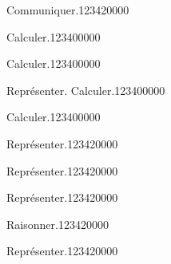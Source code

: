 \begin{pageAD} 
 

 
  
\begin{ExoCad}{Communiquer.}{1234}{2}{0}{0}{0}{0}

 
\end{ExoCad}


\begin{ExoCad}{Calculer.}{1234}{0}{0}{0}{0}{0}

 
 
\end{ExoCad}

\begin{ExoCad}{Calculer.}{1234}{0}{0}{0}{0}{0}

 
\end{ExoCad}



\begin{ExoCad}{Représenter. Calculer.}{1234}{0}{0}{0}{0}{0}

 
 
\end{ExoCad}

\begin{ExoCad}{Calculer.}{1234}{0}{0}{0}{0}{0}

 
\end{ExoCad}

 
\end{pageAD}


\begin{pageParcoursu} 

\begin{ExoCu}{Représenter.}{1234}{2}{0}{0}{0}{0}


\end{ExoCu}
\begin{ExoCu}{Représenter.}{1234}{2}{0}{0}{0}{0}


\end{ExoCu}
\begin{ExoCu}{Représenter.}{1234}{2}{0}{0}{0}{0}

\end{ExoCu}


\begin{ExoCu}{Raisonner.}{1234}{2}{0}{0}{0}{0}

\end{ExoCu}

\begin{ExoCu}{Représenter.}{1234}{2}{0}{0}{0}{0}


\end{ExoCu}


\end{pageParcoursu}

